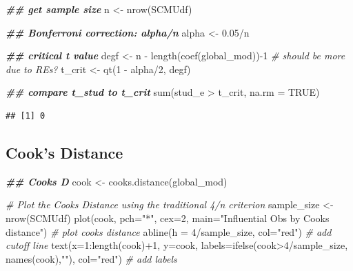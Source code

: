 \documentclass[
]{article}
\newenvironment{Shaded}{\begin{snugshade}}{\end{snugshade}}
\newcommand{\AttributeTok}[1]{\textcolor[rgb]{0.77,0.63,0.00}{#1}}
\newcommand{\CommentTok}[1]{\textcolor[rgb]{0.56,0.35,0.01}{\textit{#1}}}
\newcommand{\ConstantTok}[1]{\textcolor[rgb]{0.00,0.00,0.00}{#1}}
\newcommand{\DecValTok}[1]{\textcolor[rgb]{0.00,0.00,0.81}{#1}}
\newcommand{\DocumentationTok}[1]{\textcolor[rgb]{0.56,0.35,0.01}{\textbf{\textit{#1}}}}
\newcommand{\FloatTok}[1]{\textcolor[rgb]{0.00,0.00,0.81}{#1}}
\newcommand{\FunctionTok}[1]{\textcolor[rgb]{0.00,0.00,0.00}{#1}}
\newcommand{\NormalTok}[1]{#1}
\newcommand{\OtherTok}[1]{\textcolor[rgb]{0.56,0.35,0.01}{#1}}
\newcommand{\SpecialCharTok}[1]{\textcolor[rgb]{0.00,0.00,0.00}{#1}}
\newcommand{\StringTok}[1]{\textcolor[rgb]{0.31,0.60,0.02}{#1}}
\begin{document}
\begin{Shaded}
\begin{Highlighting}[]
\DocumentationTok{\#\# get sample size}
\NormalTok{n }\OtherTok{\textless{}{-}} \FunctionTok{nrow}\NormalTok{(SCMUdf)}

\DocumentationTok{\#\# Bonferroni correction: alpha/n}
\NormalTok{alpha }\OtherTok{\textless{}{-}} \FloatTok{0.05}\SpecialCharTok{/}\NormalTok{n}

\DocumentationTok{\#\# critical t value}
\NormalTok{degf }\OtherTok{\textless{}{-}}\NormalTok{ n }\SpecialCharTok{{-}} \FunctionTok{length}\NormalTok{(}\FunctionTok{coef}\NormalTok{(global\_mod))}\SpecialCharTok{{-}}\DecValTok{1} \CommentTok{\# should be more due to REs?}
\NormalTok{t\_crit }\OtherTok{\textless{}{-}} \FunctionTok{qt}\NormalTok{(}\DecValTok{1} \SpecialCharTok{{-}}\NormalTok{ alpha}\SpecialCharTok{/}\DecValTok{2}\NormalTok{, degf)}

\DocumentationTok{\#\# compare t\_stud to t\_crit}
\FunctionTok{sum}\NormalTok{(stud\_e }\SpecialCharTok{\textgreater{}}\NormalTok{ t\_crit, }\AttributeTok{na.rm =} \ConstantTok{TRUE}\NormalTok{)}
\end{Highlighting}
\end{Shaded}

\begin{verbatim}
## [1] 0
\end{verbatim}

\hypertarget{cooks-distance}{%
\subsection{Cook's Distance}\label{cooks-distance}}

\begin{Shaded}
\begin{Highlighting}[]
\DocumentationTok{\#\# Cook\textquotesingle{}s D}
\NormalTok{cook }\OtherTok{\textless{}{-}} \FunctionTok{cooks.distance}\NormalTok{(global\_mod)}

\CommentTok{\# Plot the Cook\textquotesingle{}s Distance using the traditional 4/n criterion}
\NormalTok{sample\_size }\OtherTok{\textless{}{-}} \FunctionTok{nrow}\NormalTok{(SCMUdf)}
\FunctionTok{plot}\NormalTok{(cook, }\AttributeTok{pch=}\StringTok{"*"}\NormalTok{, }\AttributeTok{cex=}\DecValTok{2}\NormalTok{, }\AttributeTok{main=}\StringTok{"Influential Obs by Cooks distance"}\NormalTok{)  }\CommentTok{\# plot cook\textquotesingle{}s distance}
\FunctionTok{abline}\NormalTok{(}\AttributeTok{h =} \DecValTok{4}\SpecialCharTok{/}\NormalTok{sample\_size, }\AttributeTok{col=}\StringTok{"red"}\NormalTok{)  }\CommentTok{\# add cutoff line}
\FunctionTok{text}\NormalTok{(}\AttributeTok{x=}\DecValTok{1}\SpecialCharTok{:}\FunctionTok{length}\NormalTok{(cook)}\SpecialCharTok{+}\DecValTok{1}\NormalTok{, }\AttributeTok{y=}\NormalTok{cook, }\AttributeTok{labels=}\FunctionTok{ifelse}\NormalTok{(cook}\SpecialCharTok{\textgreater{}}\DecValTok{4}\SpecialCharTok{/}\NormalTok{sample\_size, }\FunctionTok{names}\NormalTok{(cook),}\StringTok{""}\NormalTok{), }\AttributeTok{col=}\StringTok{"red"}\NormalTok{)  }\CommentTok{\# add labels}
\end{Highlighting}
\end{Shaded}
\end{document}
